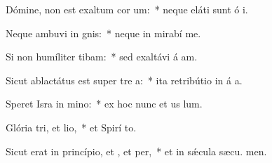 \item Dómine, non est exaltum cor um:~* neque eláti sunt ó i.
\item Neque ambuvi in gnis:~* neque in mirabí  me.
\item Si non humíliter tibam:~* sed exaltávi á am.
\item Sicut ablactátus est super tre a:~* ita retribútio in á a.
\item Speret Isra in mino:~* ex hoc nunc et us  lum.
\item Glória tri, et lio,~* et Spirí to.
\item Sicut erat in princípio, et , et per,~* et in sǽcula sæcu. men.
